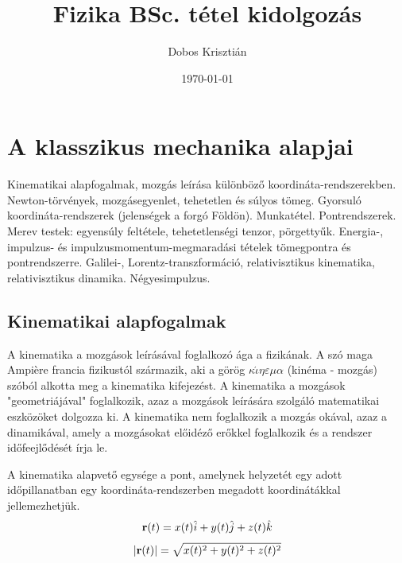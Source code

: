 \documentclass[a4paper,12pt]{article}
\title{Fizika BSc. tétel kidolgozás}
\author{Dobos Krisztián}
\date{\today}
\begin{document}
\maketitle

\section{A klasszikus mechanika alapjai}

Kinematikai alapfogalmak, mozgás leírása különböző koordináta-rendszerekben.
Newton-törvények, mozgásegyenlet, tehetetlen és súlyos tömeg. Gyorsuló koordináta-rendszerek (jelenségek a forgó Földön).
Munkatétel. Pontrendszerek. Merev testek: egyensúly feltétele, tehetetlenségi tenzor, pörgettyűk. Energia-, impulzus- és 
impulzusmomentum-megmaradási tételek tömegpontra és pontrendszerre. Galilei-, Lorentz-transzformáció, relativisztikus kinematika,
relativisztikus dinamika. Négyesimpulzus.
\subsection{Kinematikai alapfogalmak}
A kinematika a mozgások leírásával foglalkozó ága a fizikának. A szó maga Ampière francia fizikustól származik, aki a görög $\kappa \acute{\iota} \eta \varepsilon \mu \alpha$ (kinéma - mozgás) szóból alkotta meg a kinematika kifejezést.
A kinematika a mozgások "geometriájával" foglalkozik, azaz a mozgások leírására szolgáló matematikai eszközöket dolgozza ki. A kinematika nem foglalkozik a mozgás okával, azaz a dinamikával,
amely a mozgásokat előidéző erőkkel foglalkozik és a rendszer időfeejlődését írja le.

A kinematika alapvető egysége a pont, amelynek helyzetét egy adott időpillanatban egy koordináta-rendszerben megadott koordinátákkal jellemezhetjük.
\begin{equation}
    \bold{r}(t) = x(t)\hat{i} + y(t)\hat{j} + z(t)\hat{k}\\
\end{equation}
\begin{equation}
    | \bold{r}(t) | = \sqrt{x(t)^2 + y(t)^2 + z(t)^2}
\end{equation}
\end{document}
